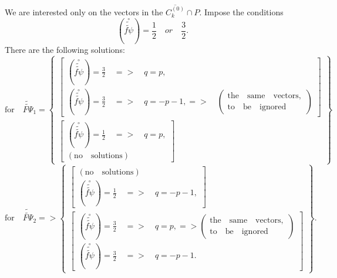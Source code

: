 \documentclass{article}
\begin{document}
We are interested only on the vectors in the $\overline{C_{k}^{\left(
0\right) }}\cap P.$ Impose the conditions 
\begin{equation*}
\left( \overset{\circ }{\widetilde{\widetilde{f\psi }}}\right) =\frac{1}{2}%
\quad or\quad \frac{3}{2}.
\end{equation*}
There are the following solutions: 
\begin{equation*}
\mathrm{for}\quad \widetilde{\widetilde{F\Psi }}_{1}=\left\{ 
\begin{array}{c}
\left[ 
\begin{array}{c}
\left( \overset{\circ }{\widetilde{\widetilde{f\psi }}}\right) =\frac{3}{2}%
\quad =>\quad q=p, \\ 
\left( \overset{\circ }{\widetilde{\widetilde{f\psi }}}\right) =\frac{3}{2}%
\quad =>\quad q=-p-1,=>\quad \left( 
\begin{array}{c}
\mathrm{the\quad same\quad vectors,} \\ 
\mathrm{to\quad be\quad ignored}
\end{array}
\right)
\end{array}
\right] \\ 
\left[ 
\begin{array}{c}
\left( \overset{\circ }{\widetilde{\widetilde{f\psi }}}\right) =\frac{1}{2}%
\quad =>\quad q=p, \\ 
\left( \mathrm{no\quad solutions}\right)
\end{array}
\right]
\end{array}
\right\}
\end{equation*}
\begin{equation*}
\mathrm{for}\quad \widetilde{\widetilde{F\Psi }}_{2}=>\left\{ 
\begin{array}{c}
\left[ 
\begin{array}{c}
\left( \mathrm{no\quad solutions}\right) \\ 
\left( \overset{\circ }{\widetilde{\widetilde{f\psi }}}\right) =\frac{1}{2}%
\quad =>\quad q=-p-1,
\end{array}
\right] \\ 
\left[ 
\begin{array}{c}
\left( \overset{\circ }{\widetilde{\widetilde{f\psi }}}\right) =\frac{3}{2}%
\quad =>\quad q=p,=>\left( 
\begin{array}{c}
\mathrm{the\quad same\quad vectors,} \\ 
\mathrm{to\quad be\quad ignored}
\end{array}
\right) \\ 
\left( \overset{\circ }{\widetilde{\widetilde{f\psi }}}\right) =\frac{3}{2}%
\quad =>\quad q=-p-1.
\end{array}
\right]
\end{array}
\right\} .
\end{equation*}
\end{document}
